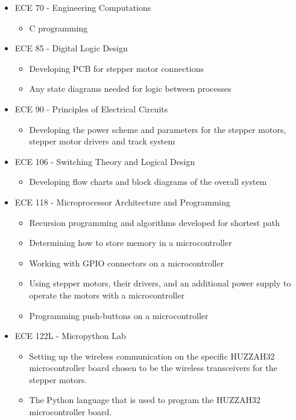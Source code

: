 \begin{itemize}
\item ECE 70 - Engineering Computations
	\begin{itemize}
		\item C programming 
	\end{itemize}
\item ECE 85 - Digital Logic Design 
	\begin{itemize}
		\item Developing PCB for stepper motor connections
		\item Any state diagrams needed for logic between processes
	\end{itemize}
\item ECE 90 - Principles of Electrical Circuits
	\begin{itemize}
		\item Developing the power scheme and parameters for the stepper motors, stepper motor drivers and track system
	\end{itemize}
\item ECE 106 - Switching Theory and Logical Design
	\begin{itemize}
		\item Developing flow charts and block diagrams of the overall system
	\end{itemize}
\item ECE 118 - Microprocessor Architecture and Programming
	\begin{itemize}
		\item Recursion programming and algorithms developed for shortest path
		\item Determining how to store memory in a microcontroller
		\item Working with GPIO connectors on a microcontroller
		\item Using stepper motors, their drivers, and an additional power supply to operate the motors with a microcontroller
		\item Programming push-buttons on a microcontroller
	\end{itemize}	
\item ECE 122L - Micropython Lab
	\begin{itemize}
		\item Setting up the wireless communication on the specific HUZZAH32 microcontroller board chosen to be the wireless transceivers for the stepper motors.
		\item The Python language that is used to program the HUZZAH32 microcontroller board.

\end{itemize}
\end{itemize}
